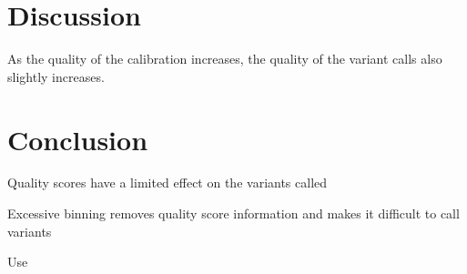 \documentclass{report}
\begin{document}
\section{Discussion}
\begin{outline}
\item As the quality of the calibration increases, the quality of the variant calls also slightly increases.
\end{outline}

\section{Conclusion}
\begin{outline}
\item Quality scores have a limited effect on the variants called
\item Excessive binning removes quality score information and makes it difficult to call variants
\item Use

\end{outline}

\printbibliography
\end{document}
